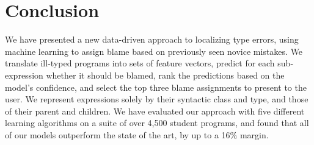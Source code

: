 \section{Conclusion}
\label{sec:conclusion}

We have presented a new data-driven approach to localizing type errors,
using machine learning to assign blame based on previously seen novice
mistakes.
%
We translate ill-typed programs into sets of feature vectors, predict
for each sub-expression whether it should be blamed, rank the
predictions based on the model's confidence, and select the top three
blame assignments to present to the user.
%
We represent expressions solely by their syntactic class and type, and
those of their parent and children.
%
We have evaluated our approach with five different learning algorithms
on a suite of over 4,500 student programs, and found that all of our
models outperform the state of the art, by up to a 16\% margin.
%






